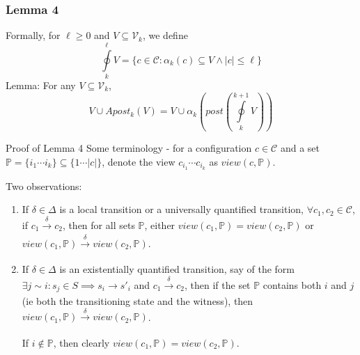 \documentclass{beamer}
\begin{document}
{        \begin{frame}
            \frametitle{Lemma 4}
                Formally, for $\ell \geq 0$ and $V \subseteq \mathcal{V}_{k}$, we define 
                \begin{equation*}
                    \oint\limits_{k}^{\ell} V = \{c \in \mathcal{C} : \alpha_{k}(c) \subseteq V \wedge \left|c\right| \leq \ell\}
                \end{equation*}
                Lemma: For any $V \subseteq \mathcal{V}_{k}$,
                \begin{equation*}
                    V \cup Apost_{k}(V) = V \cup \alpha_{k}(post(\oint\limits_{k}^{k + 1}V))
                \end{equation*}
        \end{frame}

        \begin{frame}{Proof of Lemma 4}
            Some terminology - for a configuration $c \in \mathcal{C}$ and a set $\mathbb{P} = \{i_{1}\cdots i_{k}\} \subseteq \{1\cdots \left|c\right|\}$, denote the view $c_{i_{1}}\cdots c_{i_{k}}$ as $view(c, \mathbb{P})$.

            Two observations:
            \begin{enumerate}
                \item If $\delta \in \Delta$ is a local transition or a universally quantified transition, $\forall c_{1}, c_{2} \in \mathcal{C}$, if $c_{1} \xrightarrow[]{\delta} c_{2}$, then for all sets $\mathbb{P}$, either $view(c_{1}, \mathbb{P}) = view(c_{2}, \mathbb{P})$ or $view(c_{1}, \mathbb{P}) \xrightarrow[]{\delta} view(c_{2}, \mathbb{P})$.
                \item If $\delta \in \Delta$ is an existentially quantified transition, say of the form $\exists j \sim i : s_{j} \in S \implies s_{i} \rightarrow s'_{i}$ and $c_{1} \xrightarrow[]{\delta} c_{2}$, then if the set $\mathbb{P}$ contains both $i$ and $j$ (ie both the transitioning state and the witness), then $view(c_{1}, \mathbb{P}) \xrightarrow[]{\delta} view(c_{2}, \mathbb{P})$. 
                
                If $i \notin \mathbb{P}$, then clearly $view(c_{1}, \mathbb{P}) = view(c_{2}, \mathbb{P})$.
            \end{enumerate}
        \end{frame}

}
\end{document}
